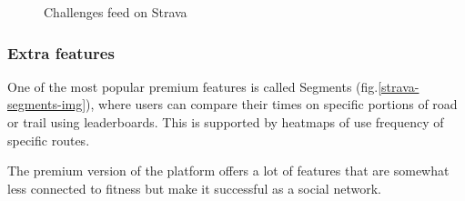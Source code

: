 \begin{figure}[h]
    \centering
    \caption{Challenges feed on Strava \cite{strava-challenges}}
    \label{strava-challenges}
\end{figure}

\subsubsection*{Extra features}
One of the most popular premium features is called Segments (fig.\ref{strava-segments-img}), where users can compare their times on specific portions of road or trail using leaderboards.
This is supported by heatmaps of use frequency of specific routes.

The premium version of the platform offers a lot of features that are somewhat less connected to fitness but make it successful as a social network.

